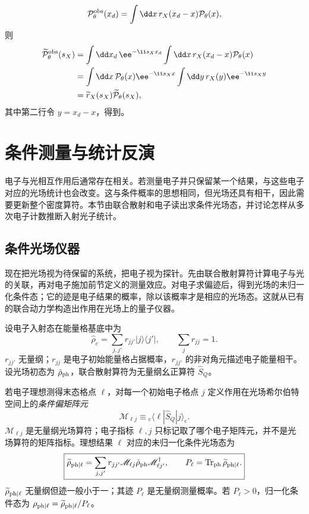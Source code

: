 \begin{exbox}[能量格与纵向相空间层析]
\[
\mathcal P_\theta^{\rm obs}(x_d)
=\int\dd x\,r_X(x_d-x)\mathcal P_\theta(x),
\]
则
\begin{align*}
\widetilde{\mathcal P}_\theta^{\rm obs}(s_X)
&=\int\dd x_d\,\ee^{-\ii s_Xx_d}
\int\dd x\,r_X(x_d-x)\mathcal P_\theta(x)\\
&=\int\dd x\,\mathcal P_\theta(x)\ee^{-\ii s_Xx}
\int\dd y\,r_X(y)\ee^{-\ii s_Xy}\\
&=\widetilde r_X(s_X)\widetilde{\mathcal P}_\theta(s_X),
\end{align*}
其中第二行令 $y=x_d-x$，得到。
\end{exbox}



\section{条件测量与统计反演}

电子与光相互作用后通常存在相关。若测量电子并只保留某一个结果，与这些电子对应的光场统计也会改变。这与条件概率的思想相同，但光场还具有相干，因此需要更新整个密度算符。本节由联合散射和电子读出求条件光场态，并讨论怎样从多次电子计数推断入射光子统计。

\subsection{条件光场仪器}

现在把光场视为待保留的系统，把电子视为探针。先由联合散射算符计算电子与光的关联，再对电子施加前节定义的测量效应。对电子求偏迹后，得到光场的未归一化条件态；它的迹是电子结果的概率，除以该概率才是相应的光场态。这就从已有的联合动力学构造出作用在光场上的量子仪器。

设电子入射态在能量格基底中为
\begin{equation*}
\hat\rho_e
=\sum_{j,j'}r_{jj'}|j\rangle\langle j'|,
\qquad
\sum_j r_{jj}=1.
\end{equation*}
$r_{jj'}$ 无量纲；$r_{jj}$ 是电子初始能量格占据概率，$r_{jj'}$ 的非对角元描述电子能量相干。设光场初态为 $\hat\rho_{\rm ph}$，联合散射算符为无量纲幺正算符 $\hat S_Q$。

若电子理想测得末态格点 $\ell$，对每一个初始电子格点 $j$ 定义作用在光场希尔伯特空间上的\emph{条件偏矩阵元}
\begin{equation*}
\mathscr M_{\ell j}
\equiv {}_e\!\langle\ell|\hat S_Q|j\rangle_e.
\end{equation*}
$\mathscr M_{\ell j}$ 是无量纲光场算符；电子指标 $\ell,j$ 只标记取了哪个电子矩阵元，并不是光场算符的矩阵指标。理想结果 $\ell$ 对应的未归一化条件光场态为
\begin{equation}
\boxed{
\widetilde\rho_{\rm ph|\ell}
=\sum_{j,j'}r_{jj'}
\mathscr M_{\ell j}\hat\rho_{\rm ph}
\mathscr M_{\ell j'}^\dagger,
\qquad
P_\ell
=\operatorname{Tr}_{\rm ph}\widetilde\rho_{\rm ph|\ell}.}
\label{eq:general_electron_meter_conditional_photon_map}
\end{equation}
$\widetilde\rho_{\rm ph|\ell}$ 无量纲但迹一般小于一；其迹 $P_\ell$ 是无量纲测量概率。若 $P_\ell>0$，归一化条件态为 $\rho_{\rm ph|\ell}=\widetilde\rho_{\rm ph|\ell}/P_\ell$。

